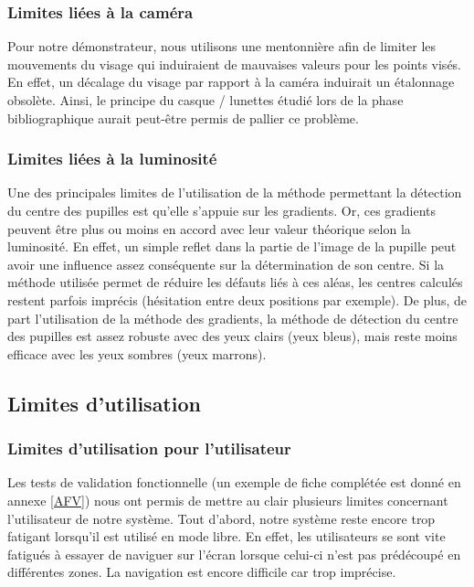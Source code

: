 \subsubsection{Limites liées à la caméra}

Pour notre démonstrateur, nous utilisons une mentonnière afin de limiter les mouvements du visage qui induiraient de mauvaises valeurs pour les points visés. En effet, un décalage du visage par rapport à la caméra induirait un étalonnage obsolète. Ainsi, le principe du casque / lunettes étudié lors de la phase bibliographique aurait peut-être permis de pallier ce problème.

\subsubsection{Limites liées à la luminosité}

Une des principales limites de l’utilisation de la méthode permettant la détection du centre des pupilles est qu’elle s’appuie sur les gradients. Or, ces gradients peuvent être plus ou moins en accord avec leur valeur théorique selon la luminosité. En effet, un simple reflet dans la partie de l’image de la pupille peut avoir une influence assez conséquente sur la détermination de son centre. Si la méthode utilisée permet de réduire les défauts liés à ces aléas, les centres calculés restent parfois imprécis (hésitation entre deux positions par exemple). De plus, de part l’utilisation de la méthode des gradients, la méthode de détection du centre des pupilles est assez robuste avec des yeux clairs (yeux bleus), mais reste moins efficace avec les yeux sombres (yeux marrons).

\subsection{Limites d'utilisation}

\subsubsection{Limites d’utilisation pour l’utilisateur}

Les tests de validation fonctionnelle (un exemple de fiche complétée est donné en annexe \ref{AFV}) nous ont permis de mettre au clair plusieurs limites concernant l’utilisateur de notre système. Tout d’abord, notre système reste encore trop fatigant lorsqu’il est utilisé en mode libre. En effet, les utilisateurs se sont vite fatigués à essayer de naviguer sur l’écran lorsque celui-ci n’est pas prédécoupé en différentes zones. La navigation est encore difficile car trop imprécise.

